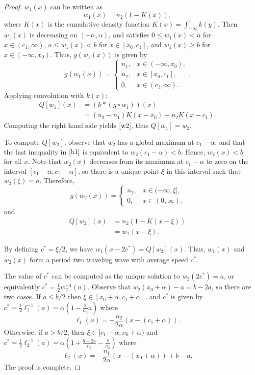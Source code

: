 \documentclass[11pt]{article}
\numberwithin{equation}{section}
\theoremstyle{definition}
\begin{document}
\begin{proof} $w_1(x)$ can be written as
$$
    w_1(x) = n_2 (1-K(x)),
$$
where $K(x)$ is the cumulative density function $K(x) = \int_{-\infty}^{x} k(y)$. Then $w_1(x)$ is decreasing on $(-\alpha,\alpha)$, and satisfies $0\leq w_1(x)<a$ for $x\in(c_1,\infty)$, $a\leq w_1(x)<b$ for $x\in[x_0,c_1]$, and $w_1(x)\geq b$ for $x\in(-\infty,x_0)$. Thus, $g(w_1(x))$ is given by
$$
g( w_1(x)) = \begin{cases}
n_1, & x \in (-\infty, x_0), \\
n_2, & x \in [x_0, c_1], \\ 
0, & x \in (c_1, \infty). \end{cases}.
$$
Applying convolution with $k(x)$:
$$ \begin{aligned}
    Q[w_1](x) &= (k*(g\circ w_1))(x) \\&= (n_2-n_1) K(x-x_0) - n_2 K(x-c_1).
\end{aligned} $$
Computing the right hand side yields $\eqref{w2}$, thus $Q[w_1]=w_2$.

To compute $Q[w_2]$, observe that $w_2$ has a global maximum at $c_1-\alpha$, and that the last inequality in $\eqref{h1}$ is equivalent to $w_2(c_1-\alpha)<b$. Hence, $w_2(x)<b$ for all $x$. Note that $w_2(x)$ decreases from its maximum at $c_1-\alpha$ to zero on the interval $[c_1-\alpha,c_1+\alpha]$, so there is a unique point $\xi$ in this interval such that $w_2(\xi)=a$. Therefore,
$$
g(w_2(x)) = \begin{cases}
n_2, & x \in (-\infty,\xi], \\
0, & x \in (0,\infty).
\end{cases}
$$
and
$$ \begin{aligned}
Q[w_2](x)
&= n_2 (1-K(x-\xi)) \\
&= w_1(x-\xi).
\end{aligned} $$

By defining $c^*=\xi/2$, we have $w_1(x-2c^*)=Q[w_2](x)$. Thus, $w_1(x)$ and $w_2(x)$ form a period two traveling wave with average speed $c^*$.

The value of $c^*$ can be computed as the unique solution to $w_2(2c^*)=a$, or equivalently $c^*=\frac{1}{2}w_2^{-1}(a)$. Observe that $w_2(x_0+\alpha)-a=b-2a$, so there are two cases. If $a\leq b/2$ then $\xi\in[x_0+\alpha,c_1+\alpha]$, and $c^*$ is given by $c^*=\frac{1}{2}\ell_1^{-1}(a)=\alpha \left( 1 - \frac{2}{n_2}a \right)$ where
$$ \ell_1(x)=-\frac{n_2}{2\alpha} (x - (c_1 + \alpha)).$$
Otherwise, if $a>b/2$, then $\xi\in[c_1-\alpha,x_0+\alpha)$ and $c^*=\frac{1}{2}\ell_2^{-1}(a)=\alpha \left( 1  + \frac{b - 2a}{n_1} - \frac{b}{n_2} \right)$ where
$$ \ell_2(x)=-\frac{n_1}{2\alpha}(x-(x_0+\alpha))+b-a.$$
The proof is complete.
\end{proof}
\end{document}
